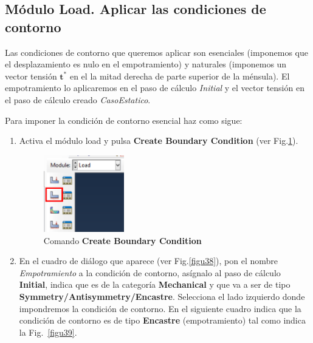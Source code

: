 \subsection{Módulo Load. Aplicar las condiciones de contorno}

Las condiciones de contorno que queremos aplicar son esenciales
(imponemos que el desplazamiento es nulo en el empotramiento) y naturales
(imponemos un vector tensión $\textbf{t}^*$ en el la
mitad derecha de parte superior de la ménsula). El empotramiento lo
aplicaremos en el paso de cálculo \textit{Initial} y el vector
tensión en el paso de cálculo creado \textit{CasoEstatico}.


Para imponer la condición de contorno esencial haz como sigue:
\begin{enumerate}
\item Activa el módulo load y pulsa \textbf{Create Boundary Condition}
  (ver Fig.\ref{figu37}).
  \begin{figure}[H]
    \centering
    \includegraphics[width=0.33\textwidth]{./body/images/imagen37.pdf}
    \caption{Comando \textbf{Create Boundary Condition}}
    \label{figu37}
  \end{figure}
\item En el cuadro de diálogo que aparece (ver Fig.\ref{figu38}), pon
  el nombre \textit{Empotramiento} a la condición de contorno,
  asígnalo al paso de cálculo \textbf{Initial}, indica que es de la
  categoría \textbf{Mechanical} y que va a ser de tipo
  \textbf{Symmetry/Antisymmetry/Encastre}. Selecciona el lado izquierdo donde impondremos la condición de contorno. En el siguiente cuadro
  indica que la condición de contorno es de tipo \textbf{Encastre}
  (empotramiento) tal como indica la Fig.~\ref{figu39}.
  \begin{figure}[H]
    \centering
    \begin{subfigure}{0.45\textwidth}

\end{subfigure}
\end{figure}
\end{enumerate}
